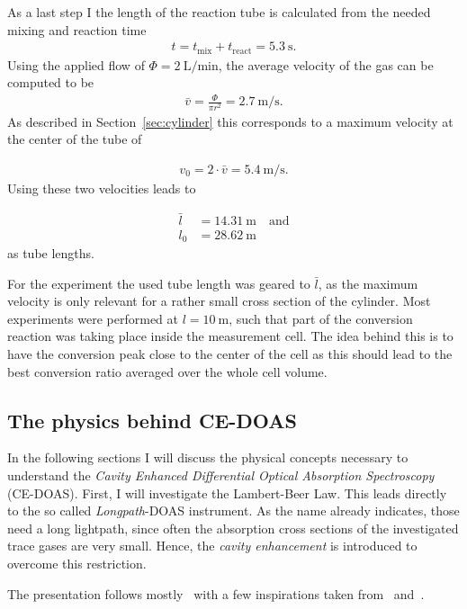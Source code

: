 As a last step I the length of the reaction tube is calculated from
the needed mixing and reaction time
\begin{align*}
  t = t_{\text{mix}} + t_{\text{react}} = \SI{5.3}{\second}.
\end{align*}
Using the applied flow of $\Phi = \SI{2}{\liter\per\minute}$, the
average velocity of the gas can be computed to be
\begin{align*}
  \bar v = \frac{\Phi}{\pi r^2} = \SI{2.7}{\meter\per\second}. 
\end{align*}
As described in Section~\ref{sec:cylinder} this corresponds to a
maximum velocity at the center of the tube of

\begin{align*}
  v_0 = 2\cdot \bar v = \SI{5.4}{\meter\per\second}.
\end{align*}
Using these two velocities leads to

\begin{align*}
  \bar l & = \SI{14.31}{\meter} \quad \text{and}\\
  l_0 & = \SI{28.62}{\meter}
\end{align*}
as tube lengths.

For the experiment the used tube length was geared to $\bar l$, as the
maximum velocity is only relevant for a rather small cross section of
the cylinder. Most experiments were performed at
$l = \SI{10}{\meter}$, such that part of the conversion reaction was
taking place inside the measurement cell. The idea behind this is to have the
conversion peak close to the center of the cell as this should lead
to the best conversion ratio averaged over the whole cell volume.

\subsection{The physics behind CE-DOAS}
\label{sec:ce-doas-physics}

In the following sections I will discuss the physical concepts
necessary to understand the \emph{Cavity Enhanced Differential Optical
  Absorption Spectroscopy} (CE-DOAS). First, I will investigate the
Lambert-Beer Law. This leads directly to the so called
\emph{Longpath}-DOAS instrument. As the name already indicates, those
need a long lightpath, since often the absorption cross sections of
the investigated trace gases are very small. Hence, the \emph{cavity
  enhancement} is introduced to overcome this restriction.

The presentation follows mostly~\cite{fp58} with a few inspirations
taken from~\cite{bsc} and~\cite{platt}.

